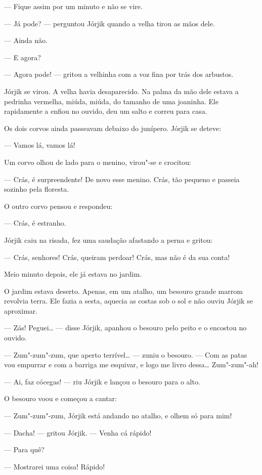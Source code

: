 --- Fique assim por um minuto e não se vire.

--- Já pode? --- perguntou Jórjik quando a velha tirou as mãos dele.

--- Ainda não.

--- E agora?

--- Agora pode! --- gritou a velhinha com a voz fina por trás dos
arbustos.

Jórjik se virou. A velha havia desaparecido. Na palma da mão dele estava
a pedrinha vermelha, miúda, miúda, do tamanho de uma joaninha. Ele
rapidamente a enfiou no ouvido, deu um salto e correu para casa.

Os dois corvos ainda passeavam debaixo do junípero. Jórjik se deteve:

--- Vamos lá, vamos lá!

Um corvo olhou de lado para o menino, virou"-se e crocitou:

--- Crás, é surpreendente! De novo esse menino. Crás, tão pequeno e
passeia sozinho pela floresta.

O outro corvo pensou e respondeu:

--- Crás, é estranho.

Jórjik caiu na risada, fez uma saudação afastando a perna e gritou:

--- Crás, senhores! Crás, queiram perdoar! Crás, mas não é da sua conta!

Meio minuto depois, ele já estava no jardim.

O jardim estava deserto. Apenas, em um atalho, um besouro grande marrom
revolvia terra. Ele fazia a sesta, aquecia as costas sob o sol e não
ouviu Jórjik se aproximar.

--- Zás! Peguei\ldots{} --- disse Jórjik, apanhou o besouro pelo peito e o
encostou no ouvido.

--- Zum"-zum"-zum, que aperto terrível\ldots{} --- zuniu o besouro. --- Com as
patas vou empurrar e com a barriga me esquivar, e logo me livro dessa\ldots{}
Zum"-zum"-ah!

--- Ai, faz cócegas! --- riu Jórjik e lançou o besouro para o alto.

O besouro voou e começou a cantar:

--- Zum"-zum"-zum, Jórjik está andando no atalho, e olhem só para mim!

--- Dacha! --- gritou Jórjik. --- Venha cá rápido!

--- Para quê?

--- Mostrarei uma coisa! Rápido!

